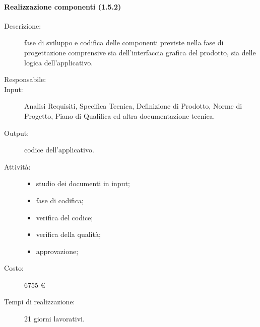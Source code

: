 \paragraph{Realizzazione componenti (1.5.2)}
\begin{description}
\item[Descrizione:] fase di sviluppo e codifica delle componenti previste nella fase di progettazione comprensive sia dell'interfaccia grafica del prodotto, sia delle logica dell'applicativo.
\item[Responsabile:] 
\item[Input:] Analisi Requisiti, Specifica Tecnica, Definizione di Prodotto, Norme di Progetto, Piano di Qualifica ed altra documentazione tecnica.
\item[Output:] codice dell'applicativo.
\item[Attività:] 
\begin{center}
\begin{itemize}
\item studio dei documenti in input;
\item fase di codifica;
\item verifica del codice;
\item verifica della qualità;
\item approvazione;
\end{itemize}
\end{center}
\item[Costo:] 6755 \euro{}
\item[Tempi di realizzazione:] 21 giorni lavorativi.
\end{description}


